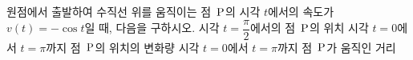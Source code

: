 \hspace*{2mm}\begin{minipage}[t]{\dimexpr\linewidth-2mm\relax}\vspace{0pt}
원점에서 출발하여 수직선 위를 움직이는 점~$\mathrm{P}$의 시각 $t$에서의 속도가 $v(t)=-\cos t$일 때, 다음을 구하시오.
 시각 $t=\dfrac{\pi}{2}$에서의 점~$\mathrm{P}$의 위치
 시각 $t=0$에서 $t=\pi$까지 점~$\mathrm{P}$의 위치의 변화량
 시각 $t=0$에서 $t=\pi$까지 점~$\mathrm{P}$가 움직인 거리\end{minipage}
